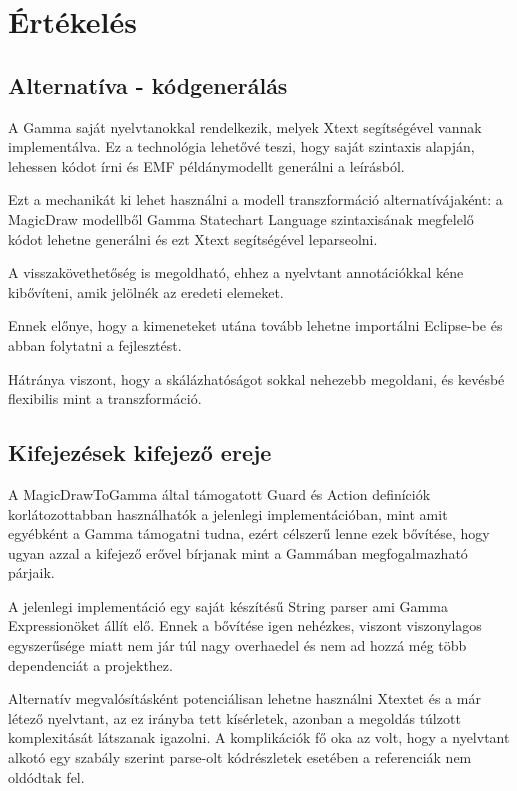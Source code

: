 \chapter{Értékelés}

\section{Alternatíva - kódgenerálás}
A Gamma saját nyelvtanokkal rendelkezik, melyek Xtext segítségével vannak implementálva. Ez a technológia lehetővé teszi, hogy saját szintaxis alapján, lehessen kódot írni és EMF példánymodellt generálni a leírásból.

Ezt a mechanikát ki lehet használni a modell transzformáció alternatívájaként: a MagicDraw modellből Gamma Statechart Language szintaxisának megfelelő kódot lehetne generálni és ezt Xtext segítségével leparseolni.

A visszakövethetőség is megoldható, ehhez a nyelvtant annotációkkal kéne kibővíteni, amik jelölnék az eredeti elemeket.

Ennek előnye, hogy a kimeneteket utána tovább lehetne importálni Eclipse-be és abban folytatni a fejlesztést.

Hátránya viszont, hogy a skálázhatóságot sokkal nehezebb megoldani, és kevésbé flexibilis mint a transzformáció.

\section{Kifejezések kifejező ereje}
A MagicDrawToGamma által támogatott Guard és Action definíciók korlátozottabban használhatók a jelenlegi implementációban, mint amit egyébként a Gamma támogatni tudna, ezért célszerű lenne ezek bővítése, hogy ugyan azzal a kifejező erővel bírjanak mint a Gammában megfogalmazható párjaik.

A jelenlegi implementáció egy saját készítésű String parser ami Gamma Expressionöket állít elő. Ennek a bővítése igen nehézkes, viszont  viszonylagos egyszerűsége miatt nem jár túl nagy overhaedel és nem ad hozzá még több dependenciát a projekthez.

Alternatív megvalósításként potenciálisan lehetne használni Xtextet és a már létező nyelvtant, az ez irányba tett kísérletek, azonban a megoldás túlzott komplexitását látszanak igazolni. A komplikációk fő oka az volt, hogy a nyelvtant alkotó egy szabály szerint parse-olt kódrészletek esetében a referenciák nem oldódtak fel.

